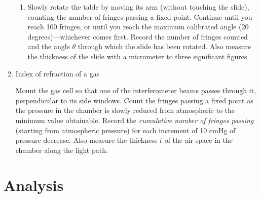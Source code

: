 \documentclass{tufte-handout}
\begin{document}
\begin{enumerate}
\begin{enumerate}
\item Slowly rotate the table by moving its arm (without touching 
the slide), counting the number of fringes passing a fixed point. Continue until you 
reach 100 fringes, or until you reach the maximum calibrated 
angle (20 degrees)---whichever comes first. Record the number 
of fringes counted and the angle $\theta$ through which the 
slide has been rotated. Also measure the thickness of the slide with a
micrometer to three significant figures.
\end{enumerate}

\item Index of refraction of a gas 

Mount the gas cell so that one of the interferometer beams passes 
through it, perpendicular to its side windows. Count the fringes 
passing a fixed point as the pressure in the chamber is slowly 
reduced from atmospheric to the minimum value obtainable. Record 
the {\em cumulative number of fringes passing} (starting from 
atmospheric pressure) for each increment of 10 cmHg of pressure 
decrease. Also measure the thickness $t$ of
the air space in the chamber along the light path. 

\end{enumerate}

\section{Analysis}
\end{document}
